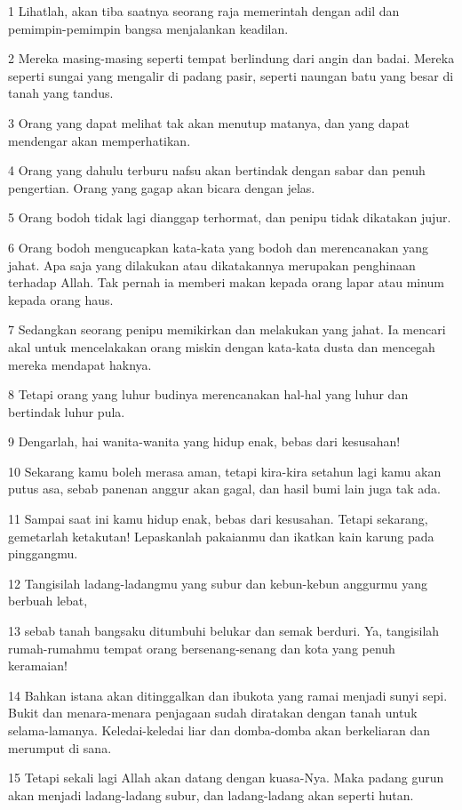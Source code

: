 \par 1 Lihatlah, akan tiba saatnya seorang raja memerintah dengan adil dan pemimpin-pemimpin bangsa menjalankan keadilan.
\par 2 Mereka masing-masing seperti tempat berlindung dari angin dan badai. Mereka seperti sungai yang mengalir di padang pasir, seperti naungan batu yang besar di tanah yang tandus.
\par 3 Orang yang dapat melihat tak akan menutup matanya, dan yang dapat mendengar akan memperhatikan.
\par 4 Orang yang dahulu terburu nafsu akan bertindak dengan sabar dan penuh pengertian. Orang yang gagap akan bicara dengan jelas.
\par 5 Orang bodoh tidak lagi dianggap terhormat, dan penipu tidak dikatakan jujur.
\par 6 Orang bodoh mengucapkan kata-kata yang bodoh dan merencanakan yang jahat. Apa saja yang dilakukan atau dikatakannya merupakan penghinaan terhadap Allah. Tak pernah ia memberi makan kepada orang lapar atau minum kepada orang haus.
\par 7 Sedangkan seorang penipu memikirkan dan melakukan yang jahat. Ia mencari akal untuk mencelakakan orang miskin dengan kata-kata dusta dan mencegah mereka mendapat haknya.
\par 8 Tetapi orang yang luhur budinya merencanakan hal-hal yang luhur dan bertindak luhur pula.
\par 9 Dengarlah, hai wanita-wanita yang hidup enak, bebas dari kesusahan!
\par 10 Sekarang kamu boleh merasa aman, tetapi kira-kira setahun lagi kamu akan putus asa, sebab panenan anggur akan gagal, dan hasil bumi lain juga tak ada.
\par 11 Sampai saat ini kamu hidup enak, bebas dari kesusahan. Tetapi sekarang, gemetarlah ketakutan! Lepaskanlah pakaianmu dan ikatkan kain karung pada pinggangmu.
\par 12 Tangisilah ladang-ladangmu yang subur dan kebun-kebun anggurmu yang berbuah lebat,
\par 13 sebab tanah bangsaku ditumbuhi belukar dan semak berduri. Ya, tangisilah rumah-rumahmu tempat orang bersenang-senang dan kota yang penuh keramaian!
\par 14 Bahkan istana akan ditinggalkan dan ibukota yang ramai menjadi sunyi sepi. Bukit dan menara-menara penjagaan sudah diratakan dengan tanah untuk selama-lamanya. Keledai-keledai liar dan domba-domba akan berkeliaran dan merumput di sana.
\par 15 Tetapi sekali lagi Allah akan datang dengan kuasa-Nya. Maka padang gurun akan menjadi ladang-ladang subur, dan ladang-ladang akan seperti hutan.
